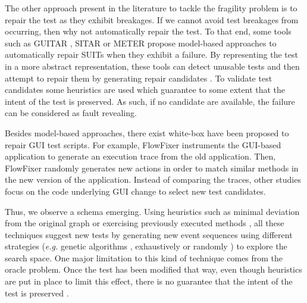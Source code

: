 The other approach present in the literature to tackle the fragility problem is to repair the test as they exhibit breakages. If we cannot avoid test breakages from occurring, then why not automatically repair the test. To that end, some tools such as GUITAR \cite{Memon2008}, SITAR \cite{Gao2016} or METER \cite{Pan2020} propose model-based approaches to automatically repair SUITs when they exhibit a failure. By representing the test in a more abstract representation, these tools can detect unusable tests and then attempt to repair them by generating repair candidates . To validate test candidates some heuristics are used which guarantee to some extent that the intent of the test is preserved. As such, if no candidate are available, the failure can be considered as fault revealing.

Besides model-based approaches, there exist white-box have been proposed to repair GUI test scripts. For example, FlowFixer \cite{Zhang2013} instruments the GUI-based application to generate an execution trace from the old application. Then, FlowFixer randomly generates new actions in order to match similar methods in the new version of the application. Instead of comparing the traces, other studies \cite{Grechanik2009, Fu2009} focus on the code underlying GUI change to select new test candidates.

Thus, we observe a schema emerging. Using heuristics such as minimal deviation from the original graph\cite{Gao2016} or exercising previously executed methods \cite{Zhang2013}, all these techniques suggest new tests by generating new event sequences using different strategies (\emph{e.g.} genetic algorithms \cite{Huang2010}, exhaustively \cite{Memon2008} or randomly \cite{Zhang2013}) to explore the search space. One major limitation to this kind of technique comes from the oracle problem. Once the test has been modified that way, even though heuristics are put in place to limit this effect, there is no guarantee that the intent of the test is preserved \cite{Li2019}.


